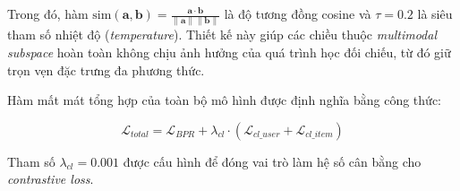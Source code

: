 Trong đó, hàm $\text{sim}(\mathbf{a}, \mathbf{b}) = \frac{\mathbf{a} \cdot \mathbf{b}}{\|\mathbf{a}\| \|\mathbf{b}\|}$ là độ tương đồng cosine và $\tau=0.2$ là siêu tham số nhiệt độ (\textit{temperature}). Thiết kế này giúp các chiều thuộc \textit{multimodal subspace} hoàn toàn không chịu ảnh hưởng của quá trình học đối chiếu, từ đó giữ trọn vẹn đặc trưng đa phương thức.

Hàm mất mát tổng hợp của toàn bộ mô hình được định nghĩa bằng công thức:

\begin{equation}
\mathcal{L}_{total} = \mathcal{L}_{BPR} + \lambda_{cl} \cdot \left( \mathcal{L}_{cl\_user} + \mathcal{L}_{cl\_item} \right)
\end{equation}

Tham số $\lambda_{cl}=0.001$ được cấu hình để đóng vai trò làm hệ số cân bằng cho \textit{contrastive loss}.

